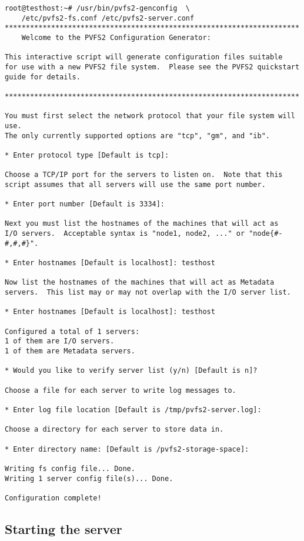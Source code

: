 \documentclass[11pt, letterpaper]{article}
\begin{document}
\begin{verbatim}
root@testhost:~# /usr/bin/pvfs2-genconfig  \
	/etc/pvfs2-fs.conf /etc/pvfs2-server.conf
**********************************************************************
	Welcome to the PVFS2 Configuration Generator:

This interactive script will generate configuration files suitable
for use with a new PVFS2 file system.  Please see the PVFS2 quickstart
guide for details.

**********************************************************************

You must first select the network protocol that your file system will use.
The only currently supported options are "tcp", "gm", and "ib".

* Enter protocol type [Default is tcp]: 

Choose a TCP/IP port for the servers to listen on.  Note that this
script assumes that all servers will use the same port number.

* Enter port number [Default is 3334]: 

Next you must list the hostnames of the machines that will act as
I/O servers.  Acceptable syntax is "node1, node2, ..." or "node{#-#,#,#}".

* Enter hostnames [Default is localhost]: testhost

Now list the hostnames of the machines that will act as Metadata
servers.  This list may or may not overlap with the I/O server list.

* Enter hostnames [Default is localhost]: testhost

Configured a total of 1 servers:
1 of them are I/O servers.
1 of them are Metadata servers.

* Would you like to verify server list (y/n) [Default is n]? 

Choose a file for each server to write log messages to.

* Enter log file location [Default is /tmp/pvfs2-server.log]: 

Choose a directory for each server to store data in.

* Enter directory name: [Default is /pvfs2-storage-space]: 

Writing fs config file... Done.
Writing 1 server config file(s)... Done.

Configuration complete!
\end{verbatim}

\subsection{Starting the server}
\end{document}
